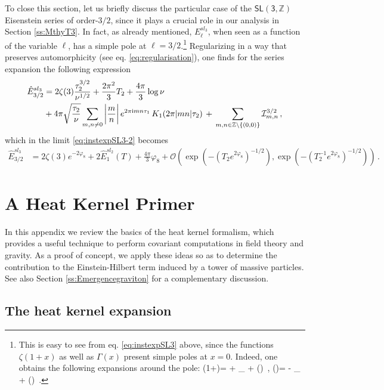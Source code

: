 To close this section, let us briefly discuss the particular case of the $\mathsf{SL(3, \mathbb{Z})}$ Eisenstein series of order-$3/2$, since it plays a crucial role in our analysis in Section \ref{ss:MthyT3}. In fact, as already mentioned, $E_{\ell}^{sl_3}$, when seen as a function of the variable $\ell$, has a simple pole at $\ell=3/2$.\footnote{This is easy to see from eq. \eqref{eq:instexpSL3} above, since the functions $\zeta(1+x)$ as well as $\Gamma(x)$ present simple poles at $x=0$. Indeed, one obtains the following expansions around the pole:
%
\beq
\notag \zeta(1+\epsilon)=  + \gamma_{} + (\epsilon)\, , \qquad \Gamma(\epsilon)= - \gamma_{} + (\epsilon)\, .
%
\eeq} Regularizing in a way that preserves automorphicity (see eq. \eqref{eq:regularisation}), one finds for the series expansion the following expression
%
\begin{align}\label{eq:Eisenstein3/2}
	\notag \hat{E}_{3/2}^{sl_3} &= 2\zeta(3) \frac{\tau_2^{3/2}}{\nu^{1/2}} + \frac{2 \pi^2}{3} T_2 + \frac{4\pi}{3} \log \nu\\
 &+  4\pi \sqrt{\frac{\tau_2}{\nu}} \sum_{m,n \neq 0} \left| \frac{m}{n}\right| e^{2\pi \text{i} m n\tau_1}\, K_{1} (2\pi |m n| \tau_2)\, +\, \sum_{m, n \in \mathbb{Z} \setminus \lbrace (0,0) \rbrace} \mathcal{I}^{3/2}_{m, n}\, ,
\end{align}
%
which in the limit \eqref{eq:instexpSL3-2} becomes \cite{Green:2010wi}
%
\begin{align}\label{eq:Eisenstein3/2-2}
	\hat{E}_{3/2}^{sl_3} &= 2\zeta(3) e^{-2\varphi_8} + 2 \hat{E}_{1}^{sl_2} (T) + \frac{4 \pi}{3} \varphi_8 + \mathcal{O} \left( \exp(-(T_2 e^{2\varphi_8})^{-1/2}),\exp(-(T_2^{-1} e^{2\varphi_8})^{-1/2})\right)\, .
\end{align}
%

\chapter{A Heat Kernel Primer}
\label{ap:heatkernel}

In this appendix we review the basics of the heat kernel formalism, which provides a useful technique to perform covariant computations in field theory and gravity. As a proof of concept, we apply these ideas so as to determine the contribution to the Einstein-Hilbert term induced by a tower of massive particles. See also Section \ref{ss:Emergencegraviton} for a complementary discussion.

\section{The heat kernel expansion}
\label{s:intro}

